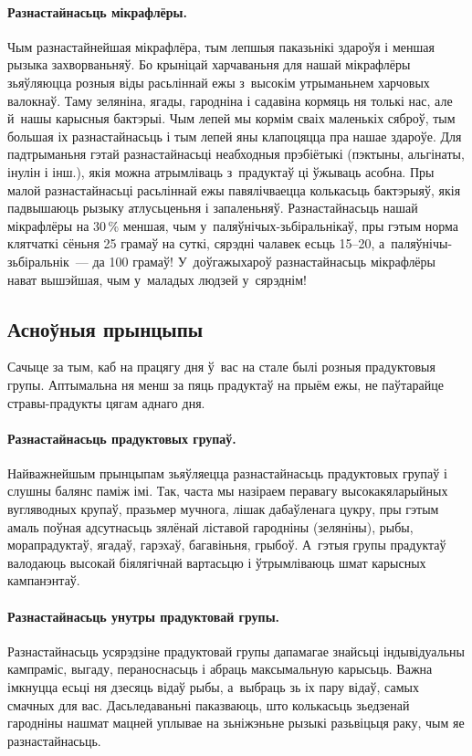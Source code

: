 \paragraph{Разнастайнасьць мікрафлёры.}
Чым разнастайнейшая мікрафлёра, тым лепшыя паказьнікі здароўя і меншая рызыка захворваньняў. Бо крыніцай харчаваньня для нашай мікрафлёры зьяўляюцца розныя віды расьліннай ежы з~высокім утрыманьнем харчовых валокнаў. Таму зеляніна, ягады, гародніна і садавіна кормяць ня толькі нас, але й~нашы карысныя бактэрыі. Чым лепей мы кормім сваіх маленькіх сяброў, тым большая іх разнастайнасьць і тым лепей яны клапоцяцца пра нашае здароўе. Для падтрыманьня гэтай разнастайнасьці неабходныя прэбіётыкі (пэктыны, альгінаты, інулін і інш.), якія можна атрымліваць з~прадуктаў ці ўжываць асобна. Пры малой разнастайнасьці расьліннай ежы павялічваецца колькасьць бактэрыяў, якія падвышаюць рызыку атлусьценьня і запаленьняў. Разнастайнасьць нашай мікрафлёры на 30\,\% меншая, чым у~паляўнічых-зьбіральнікаў, пры гэтым норма клятчаткі сёньня 25 грамаў на суткі, сярэдні чалавек есьць 15--20, а~паляўнічы-зьбіральнік~--- да 100 грамаў! У~доўгажыхароў разнастайнасьць мікрафлёры нават вышэйшая, чым у~маладых людзей у~сярэднім!

\subsection{Асноўныя прынцыпы}

Сачыце за тым, каб на працягу дня ў~вас на стале былі розныя прадуктовыя групы. Аптымальна ня менш за пяць прадуктаў на прыём ежы, не паўтарайце стравы-прадукты цягам аднаго дня.

\paragraph{Разнастайнасьць прадуктовых групаў.}
Найважнейшым прынцыпам зьяўляецца разнастайнасьць прадуктовых групаў і слушны балянс паміж імі. Так, часта мы назіраем перавагу высокакяларыйных вугляводных крупаў, празьмер мучнога, лішак дабаўленага цукру, пры гэтым амаль поўная адсутнасьць зялёнай ліставой гародніны (зеляніны), рыбы, морапрадуктаў, ягадаў, гарэхаў, багавіньня, грыбоў. А~гэтыя групы прадуктаў валодаюць высокай біялягічнай вартасьцю і ўтрымліваюць шмат карысных кампанэнтаў.

\paragraph{Разнастайнасьць унутры прадуктовай групы.}
Разнастайнасьць усярэдзіне прадуктовай групы дапамагае знайсьці індывідуальны кампраміс, выгаду, пераноснасьць і абраць максымальную карысьць. Важна імкнуцца есьці ня дзесяць відаў рыбы, а~выбраць зь іх пару відаў, самых смачных для вас. Дасьледаваньні паказваюць, што колькасьць зьедзенай гародніны нашмат мацней уплывае на зьніжэньне рызыкі разьвіцьця раку, чым яе разнастайнасьць.

